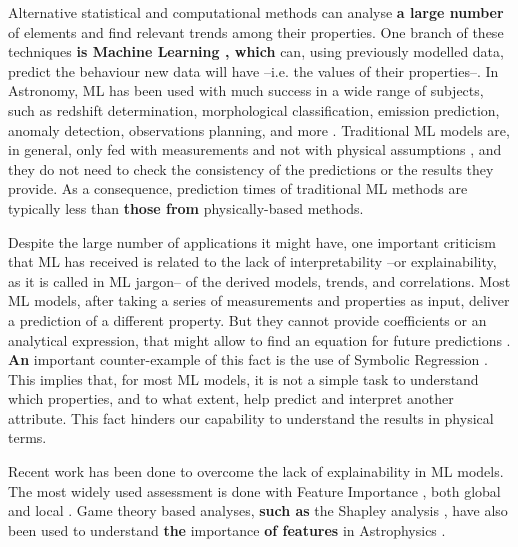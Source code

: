 \documentclass{aa}
\begin{document}
Alternative statistical and computational methods can analyse \textbf{a large number} of elements and find relevant trends among their properties. One branch of these techniques \textbf{is Machine Learning \citep[ML;][]{5392560}, which} can, using previously modelled data, predict the behaviour new data will have --i.e. the values of their properties--.
In Astronomy, ML has been used with much success in a wide range of subjects, such as redshift determination, morphological classification, emission prediction, anomaly detection, observations planning, and more \citep[e.g.][]{2010IJMPD..19.1049B, 2019arXiv190407248B}. Traditional ML models are, in general, only fed with measurements and not with physical assumptions \citep{Desai2021}, and they do not need to check the consistency of the predictions or the results they provide. As a consequence, prediction times of traditional ML methods are typically less than \textbf{those from} physically-based methods.

Despite the large number of applications it might have, one important criticism that ML has received is related to the lack of interpretability --or explainability, as it is called in ML jargon-- of the derived models, trends, and correlations. Most ML models, after taking a series of measurements and properties as input, deliver a prediction of a different property. But they cannot provide coefficients or an analytical expression, that might allow to find an equation for future predictions \citep{goebel2018explainable}. \textbf{An} important counter-example of this fact is the use of Symbolic Regression \citep[e.g.][]{2020arXiv200611287C, 2021ApJ...915...71V, 2023arXiv230501582C}. This implies that, for most ML models, it is not a simple task to understand which properties, and to what extent, help predict and interpret another attribute. This fact hinders our capability to understand the results in physical terms.

Recent work has been done to overcome the lack of explainability in ML models. The most widely used assessment is done with Feature Importance \citep{10.1007/978-3-030-10925-7_40, 9007737}, both global and local \citep{Saarela2021}. Game theory based analyses, \textbf{such as} the Shapley analysis \citep{Shapley_article}, have also been used to understand \textbf{the} importance \textbf{of features} in Astrophysics \citep[e.g.][]{2021MNRAS.507.1468M, 2021Galax...9...86C, 2022MNRAS.515.5285D, 2022MNRAS.509.3441A, 2022MNRAS.516.4716A}. 
\end{document}

